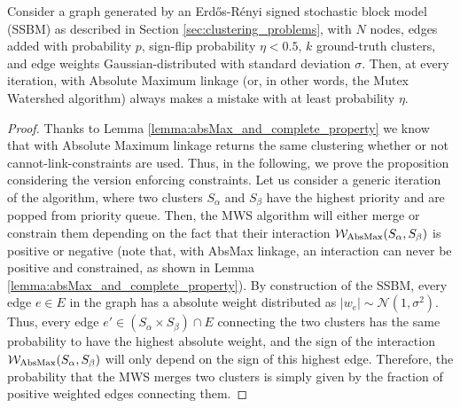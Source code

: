 \begin{prop} \label{prop:MWS_on_SSBM}
Consider a graph generated by an Erd\H os-R\'enyi signed stochastic block model (SSBM) as described in Section \ref{sec:clustering_problems}, with $N$ nodes, edges added with probability $p$, sign-flip probability $\eta<0.5$, $k$ ground-truth clusters, and edge weights Gaussian-distributed with standard deviation $\sigma$. Then, at every iteration, \algname{} with Absolute Maximum linkage (or, in other words, the Mutex Watershed algorithm) always makes a mistake with at least probability $\eta$. 
\end{prop}
\begin{proof}
Thanks to Lemma \ref{lemma:absMax_and_complete_property} we know that \algname{} with Absolute Maximum linkage returns the same clustering whether or not cannot-link-constraints are used. Thus, in the following, we prove the proposition considering the version enforcing constraints.
Let us consider a generic iteration of the algorithm, where two clusters $S_\alpha$ and $S_\beta$ have the highest priority and are popped from priority queue. Then, the MWS algorithm will either merge or constrain them depending on the fact that their interaction $\mathcal{W}_{\mathrm{AbsMax}}(S_\alpha,S_\beta)$ is  positive or negative (note that, with AbsMax linkage, an interaction can never be positive and constrained, as shown in Lemma \ref{lemma:absMax_and_complete_property}).
By construction of the SSBM, every edge $e\in E$ in the graph has a absolute weight distributed as $|w_e|\sim \mathcal{N}(1,\sigma^2)$. Thus, every edge $e'\in(S_{\alpha} \times S_{\beta})\cap E$ connecting the two clusters has the same probability to have the highest absolute weight, and the sign of the interaction $\mathcal{W}_{\mathrm{AbsMax}}(S_\alpha,S_\beta)$ will only depend on the sign of this highest edge. Therefore, the probability that the MWS merges two clusters is simply given by the fraction of positive weighted edges connecting them.


\end{proof}
